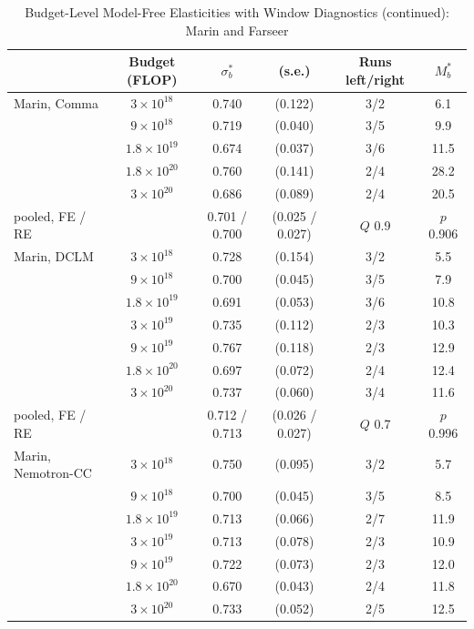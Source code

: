 \begin{table}[tp]
\centering
\caption{Budget-Level Model-Free Elasticities with Window Diagnostics (continued): Marin and Farseer}
\label{tab:app-budgets-b}
\footnotesize
\setlength{\tabcolsep}{2pt}
\begin{tabular*}{\textwidth}{@{\extracolsep{\fill}}>{\raggedright\arraybackslash}p{}ccccc@{}}
\toprule
 & Budget (FLOP) & $\sigma^*_b$ & (s.e.) & Runs left/right & $M^*_b$ \\
\midrule
Marin, Comma & $3\times10^{18}$ & 0.740 & (0.122) & 3/2 & 6.1 \\
 & $9\times10^{18}$ & 0.719 & (0.040) & 3/5 & 9.9 \\
 & $1.8\times10^{19}$ & 0.674 & (0.037) & 3/6 & 11.5 \\
 & $1.8\times10^{20}$ & 0.760 & (0.141) & 2/4 & 28.2 \\
 & $3\times10^{20}$ & 0.686 & (0.089) & 2/4 & 20.5 \\
\quad pooled, FE / RE & & 0.701 / 0.700 & (0.025 / 0.027) & $Q$ 0.9 & $p$ 0.906 \\
\addlinespace
Marin, DCLM & $3\times10^{18}$ & 0.728 & (0.154) & 3/2 & 5.5 \\
 & $9\times10^{18}$ & 0.700 & (0.045) & 3/5 & 7.9 \\
 & $1.8\times10^{19}$ & 0.691 & (0.053) & 3/6 & 10.8 \\
 & $3\times10^{19}$ & 0.735 & (0.112) & 2/3 & 10.3 \\
 & $9\times10^{19}$ & 0.767 & (0.118) & 2/3 & 12.9 \\
 & $1.8\times10^{20}$ & 0.697 & (0.072) & 2/4 & 12.4 \\
 & $3\times10^{20}$ & 0.737 & (0.060) & 3/4 & 11.6 \\
\quad pooled, FE / RE & & 0.712 / 0.713 & (0.026 / 0.027) & $Q$ 0.7 & $p$ 0.996 \\
\addlinespace
Marin, Nemotron-CC & $3\times10^{18}$ & 0.750 & (0.095) & 3/2 & 5.7 \\
 & $9\times10^{18}$ & 0.700 & (0.045) & 3/5 & 8.5 \\
 & $1.8\times10^{19}$ & 0.713 & (0.066) & 2/7 & 11.9 \\
 & $3\times10^{19}$ & 0.713 & (0.078) & 2/3 & 10.9 \\
 & $9\times10^{19}$ & 0.722 & (0.073) & 2/3 & 12.0 \\
 & $1.8\times10^{20}$ & 0.670 & (0.043) & 2/4 & 11.8 \\
 & $3\times10^{20}$ & 0.733 & (0.052) & 2/5 & 12.5 \\

\end{tabular*}
\end{table}
